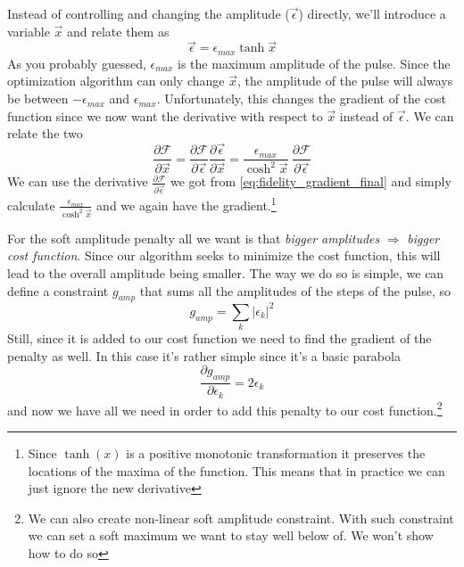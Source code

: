 Instead of controlling and changing the amplitude ($\vec{\epsilon}$) directly, we'll introduce a variable $\vec{x}$ and relate them as
\[
    \vec{\epsilon} = \epsilon_{max}\tanh{\vec{x}}
\]
As you probably guessed, $\epsilon_{max}$ is the maximum amplitude of the pulse.
Since the optimization algorithm can only change $\vec{x}$, the amplitude of the pulse will always be between $-\epsilon_{max}$ and $\epsilon_{max}$. Unfortunately, this changes the gradient of the cost function since we now want the derivative with respect to $\vec{x}$ instead of $\vec{\epsilon}$. We can relate the two
\[
\frac{\partial \mathcal{F}}{\partial \vec{x}} = \frac{\partial \mathcal{F}}{\partial \vec{\epsilon}}\frac{\partial \vec{\epsilon}}{\partial \vec{x}} = \frac{\epsilon_{max}}{\cosh^2{\vec{x}}} \ \frac{\partial \mathcal{F}}{\partial \vec{\epsilon}}
\]
We can use the derivative $\frac{\partial \mathcal{F}}{\partial \vec{\epsilon}}$ we got from \ref{eq:fidelity_gradient_final} and simply calculate $\frac{\epsilon_{max}}{\cosh^2{\vec{x}}}$ and we again have the gradient.\footnote{Since $\tanh (x)$ is a positive monotonic transformation it preserves the locations of the maxima of the function. This means that in practice we can just ignore the new derivative}

For the soft amplitude penalty all we want is that \textit{bigger amplitudes} $\Rightarrow$ \textit{bigger cost function}. Since our algorithm seeks to minimize the cost function, this will lead to the overall amplitude being smaller. The way we do so is simple, we can define a constraint $g_{amp}$ that sums all the amplitudes of the steps of the pulse, so
\[
    g_{amp} = \sum_k |\epsilon_k|^2
\]
Still, since it is added to our cost function we need to find the gradient of the penalty as well. In this case it's rather simple since it's a basic parabola
\[
    \frac{\partial g_{amp}}{\partial \epsilon_k} = 2\epsilon_k
\]
and now we have all we need in order to add this penalty to our cost function.\footnote{We can also create non-linear soft amplitude constraint. With such constraint we can set a soft maximum we want to stay well below of. We won't show how to do so}%

